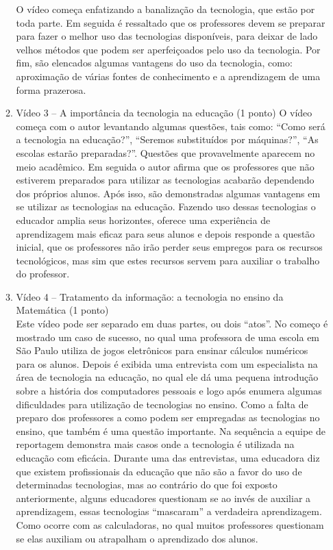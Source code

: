 \documentclass[a4paper, 12pt]{article}
\begin{document}
\begin{enumerate}
\begin{enumerate}
    O vídeo começa enfatizando a banalização da tecnologia, que estão por toda parte. Em seguida é ressaltado que os professores devem se preparar para fazer o melhor uso das tecnologias disponíveis, para deixar de lado velhos métodos que podem ser aperfeiçoados pelo uso da tecnologia.
    Por fim, são elencados algumas vantagens do uso da tecnologia, como: aproximação de várias fontes de conhecimento e a aprendizagem de uma forma prazerosa. \\
  \item Vídeo 3 – A importância da tecnologia na educação (1 ponto)
    O vídeo começa com o autor levantando algumas questões, tais como: ``Como será a tecnologia na educação?'', ``Seremos substituídos por máquinas?'', ``As escolas estarão preparadas?''. Questões que provavelmente aparecem no meio acadêmico. Em seguida o autor afirma que os professores que não estiverem preparados para utilizar as tecnologias acabarão dependendo dos próprios alunos. Após isso, são demonstradas algumas vantagens em se utilizar as tecnologias na educação. Fazendo uso dessas tecnologias o educador amplia seus horizontes, oferece uma experiência de aprendizagem mais eficaz para seus alunos e depois responde a questão inicial, que os professores não irão perder seus empregos para os recursos tecnológicos, mas sim que estes recursos servem para auxiliar o trabalho do professor.
  \item Vídeo 4 – Tratamento da informação: a tecnologia no ensino da Matemática (1 ponto) \\
    Este vídeo pode ser separado em duas partes, ou dois ``atos''. No começo é mostrado um caso de sucesso, no qual uma professora de uma escola em São Paulo utiliza de jogos eletrônicos para ensinar cálculos numéricos para os alunos. Depois é exibida uma entrevista com um especialista na área de tecnologia na educação, no qual ele dá uma pequena introdução sobre a história dos computadores pessoais e logo após enumera algumas dificuldades para utilização de tecnologias no ensino. Como a falta de preparo dos professores a como podem ser empregadas as tecnologias no ensino, que também é uma questão importante.
    Na sequência a equipe de reportagem demonstra mais casos onde a tecnologia é utilizada na educação com eficácia. Durante uma das entrevistas, uma educadora diz que existem profissionais da educação que não são a favor do uso de determinadas tecnologias, mas ao contrário do que foi exposto anteriormente, alguns educadores questionam se ao invés de auxiliar a aprendizagem, essas tecnologias ``mascaram'' a verdadeira aprendizagem.  Como ocorre com as calculadoras, no qual muitos professores questionam se elas auxiliam ou atrapalham o aprendizado dos alunos.

\end{enumerate}
\end{enumerate}
\end{document}
